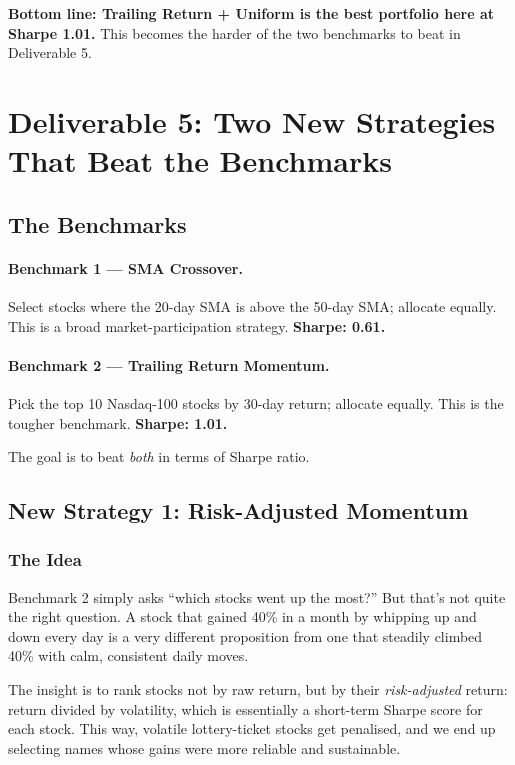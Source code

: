 \documentclass[11pt,a4paper]{article}
\begin{document}
\textbf{Bottom line: Trailing Return + Uniform is the best portfolio here at Sharpe 1.01.}
This becomes the harder of the two benchmarks to beat in Deliverable 5.

\section{Deliverable 5: Two New Strategies That Beat the Benchmarks}

\subsection{The Benchmarks}

\paragraph{Benchmark 1 --- SMA Crossover.}
Select stocks where the 20-day SMA is above the 50-day SMA; allocate equally.
This is a broad market-participation strategy. \textbf{Sharpe: 0.61.}

\paragraph{Benchmark 2 --- Trailing Return Momentum.}
Pick the top 10 Nasdaq-100 stocks by 30-day return; allocate equally.
This is the tougher benchmark. \textbf{Sharpe: 1.01.}

The goal is to beat \emph{both} in terms of Sharpe ratio.

\subsection{New Strategy 1: Risk-Adjusted Momentum}

\subsubsection{The Idea}

Benchmark 2 simply asks ``which stocks went up the most?''
But that's not quite the right question.
A stock that gained 40\% in a month by whipping up and down every day is
a very different proposition from one that steadily climbed 40\% with calm,
consistent daily moves.

The insight is to rank stocks not by raw return, but by their \emph{risk-adjusted} return:
return divided by volatility, which is essentially a short-term Sharpe score for each stock.
This way, volatile lottery-ticket stocks get penalised, and we end up selecting
names whose gains were more reliable and sustainable.
\end{document}
